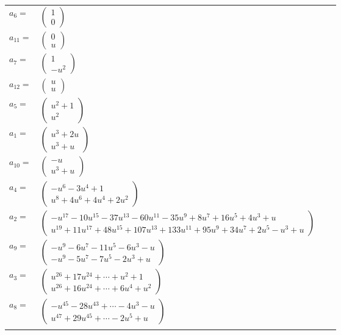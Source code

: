 \documentclass[1p]{elsarticle_modified}
\theoremstyle{definition}
\begin{document}
\begin{tabular}{m{7pt} m{180pt} m{7pt} m{180pt} }
\flushright $a_{6}=$&$\begin{pmatrix}1\\0\end{pmatrix}$ \\
\flushright $a_{11}=$&$\begin{pmatrix}0\\u\end{pmatrix}$ \\
\flushright $a_{7}=$&$\begin{pmatrix}1\\- u^2\end{pmatrix}$ \\
\flushright $a_{12}=$&$\begin{pmatrix}u\\u\end{pmatrix}$ \\
\flushright $a_{5}=$&$\begin{pmatrix}u^2+1\\u^2\end{pmatrix}$ \\
\flushright $a_{1}=$&$\begin{pmatrix}u^3+2 u\\u^3+u\end{pmatrix}$ \\
\flushright $a_{10}=$&$\begin{pmatrix}- u\\u^3+u\end{pmatrix}$ \\
\flushright $a_{4}=$&$\begin{pmatrix}- u^6-3 u^4+1\\u^8+4 u^6+4 u^4+2 u^2\end{pmatrix}$ \\
\flushright $a_{2}=$&$\begin{pmatrix}- u^{17}-10 u^{15}-37 u^{13}-60 u^{11}-35 u^9+8 u^7+16 u^5+4 u^3+u\\u^{19}+11 u^{17}+48 u^{15}+107 u^{13}+133 u^{11}+95 u^9+34 u^7+2 u^5- u^3+u\end{pmatrix}$ \\
\flushright $a_{9}=$&$\begin{pmatrix}- u^9-6 u^7-11 u^5-6 u^3- u\\- u^9-5 u^7-7 u^5-2 u^3+u\end{pmatrix}$ \\
\flushright $a_{3}=$&$\begin{pmatrix}u^{26}+17 u^{24}+\cdots+u^2+1\\u^{26}+16 u^{24}+\cdots+6 u^4+u^2\end{pmatrix}$ \\
\flushright $a_{8}=$&$\begin{pmatrix}- u^{45}-28 u^{43}+\cdots-4 u^3- u\\u^{47}+29 u^{45}+\cdots-2 u^5+u\end{pmatrix}$\\&\end{tabular}
\end{document}
